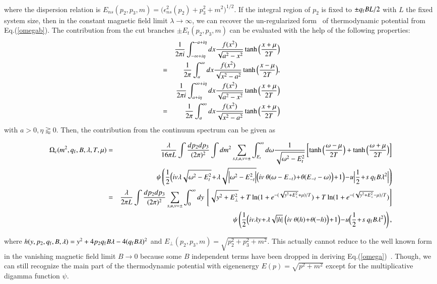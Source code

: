 \documentclass[aps,prd,amsmath,two column,amssymb,showpacs]{revtex4}
\begin{document}
where the dispersion relation is $E_{ns}(p_2,p_3,m)=\Big(\epsilon_{ns}^2(p_2)+p_3^2+m^2\Big)^{1/2}$. If the integral region of $p_2$ is fixed to $\pm q_{\rm f}BL/2$ with $L$ the fixed system size, then in the constant magnetic field limit $\lambda\rightarrow\infty$, we can recover the un-regularized form~\cite{Cao:2015xja} of thermodynamic potential from Eq.(\ref{omegab}). The contribution from the cut branches $\pm E_{t}(p_2,p_3,m)$ can be evaluated with the help of the following properties:
\begin{eqnarray}
&&{1\over2\pi i}\int_{-\infty+i\eta}^{-a+i\eta}dx{f(x^2)\over\sqrt{a^2-x^2}}\tanh\Big({x+\mu\over2T}\Big)\nonumber\\
&=&{1\over2\pi}\int_{a}^\infty dx{f(x^2)\over\sqrt{x^2-a^2}}\tanh\Big({x-\mu\over2T}\Big),\nonumber\\
&&{1\over2\pi i}\int_{a+i\eta}^{\infty+i\eta}dx{f(x^2)\over\sqrt{a^2-x^2}}\tanh\Big({x+\mu\over2T}\Big)\nonumber\\
&=&{1\over2\pi}\int_{a}^\infty dx{f(x^2)\over\sqrt{x^2-a^2}}\tanh\Big({x+\mu\over2T}\Big)
\end{eqnarray}
with $a>0,\eta\gtrapprox0$. Then, the contribution from the continuum spectrum can be given as
\begin{widetext}
\begin{eqnarray}
\Omega_c(m^2,q_{\rm f},B,\lambda,T,\mu)
&=&{\lambda\over16\pi L}\int{dp_2dp_3\over(2\pi)^2}\int{dm^2} \sum_{s,t,u,v=\pm}\int_{E_{t}}^\infty d\omega{1\over\sqrt{\omega^2-E_{t}^2}}\left[\tanh\Big({\omega-\mu\over2T}\Big)+\tanh\Big({\omega+\mu\over2T}\Big)\right]\nonumber\\
&&\psi\left({1\over2}\Big({iv\lambda}\sqrt{\omega^2-E_{t}^2}\!+\!{\lambda}\sqrt{\Big|\omega^2-E_{-t}^2\Big|}\Big(iv~\theta(\omega-{E_{-t}})\!+\!\theta({E_{-t}}-\omega)\Big)\!+\!1\Big)\!-\!u\Big|{1\over2}\!+\!s~q_{\rm f}B\lambda^2\Big|\right)\nonumber\\
&=&{\lambda\over2\pi L}\int{dp_2dp_3\over(2\pi)^2}\sum_{s,u,v=\pm}\int_{0}^\infty {dy}~\left[\sqrt{y^2+E_\bot^2}+T\ln(1+e^{-(\sqrt{y^2+E_\bot^2}+\mu)/T})+T\ln(1+e^{-(\sqrt{y^2+E_\bot^2}-\mu)/T})\right]\nonumber\\
&&\psi\left({1\over2}\Big({iv\lambda}y\!+\!{\lambda}\sqrt{|h|}~\Big(iv~\theta(h)\!+\!\theta(-h)\Big)\!+\!1\Big)\!-\!u\Big({1\over2}\!+\!s~q_{\rm f}B\lambda^2\Big)\right), 
\end{eqnarray}
\end{widetext} 
where $h(y,p_2,q_{\rm f},B,\lambda)=y^2+4p_2q_{\rm f}B\lambda-4(q_{\rm f}B\lambda)^2$ and $E_\bot(p_2,p_3,m)=\sqrt{p_2^2+p_3^2+m^2}$. This actually cannot reduce to the well known form in the vanishing magnetic field limit $B\rightarrow0$ because some $B$ independent terms have been dropped in deriving Eq.(\ref{omega})~\cite{Cangemi:1995ee}. Though, we can still recognize the main part of the thermodynamic potential with eigenenergy $E(p)=\sqrt{p^2+m^2}$ except for the multiplicative digamma function $\psi$.
\end{document}
